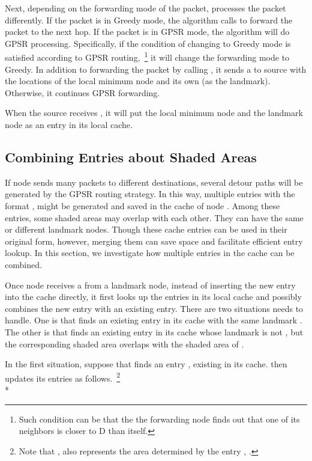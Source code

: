 \documentclass[3p,times]{elsarticle}
\begin{document}
Next, depending on the forwarding mode of the packet, 
processes the packet differently.
If the packet is in Greedy mode, the algorithm calls 
to forward the packet to the next hop.
If the packet is in GPSR mode, the algorithm will do GPSR processing.
Specifically, if the condition of changing to Greedy mode is satisfied according to
GPSR routing,~\footnote{Such condition can be that the the forwarding
node finds out that one of its neighbors is closer to D than itself.}
it will change the forwarding mode to Greedy.
In addition to forwarding the packet by calling , it sends a
 to source  with the locations of the local minimum
node  and its own (as the landmark).
Otherwise, it continues GPSR forwarding.





When the source receives
,
it will put the local minimum node  and the landmark node  as an entry in its local cache.



\subsection{Combining Entries about Shaded Areas}
\label{merge}


If node  sends many packets to different destinations, several detour paths will be generated by the GPSR routing strategy.
In this way, multiple entries with the format  ,   might be
generated and saved in the cache of node .
Among these entries, some shaded areas may overlap with each other. They
can have the same or different landmark nodes.
Though these cache entries can be used in their original form,
however, merging them can save space and facilitate efficient entry lookup.
In this section, we investigate how multiple entries in the cache can be combined.

Once node  receives a 
 from a landmark node, instead of inserting the new entry into the cache
directly, it first
looks up the entries in its local cache and possibly combines the new entry with an existing entry.
There are two situations  needs to handle. One is that  finds an existing entry in its cache with the same landmark .
The other is that
 finds an existing entry in its cache whose landmark is not ,
but the corresponding shaded area overlaps with the shaded area of .


In the first situation, suppose that  finds an entry  ,   existing in its cache.  then updates
its entries as follows.~\footnote{Note that  ,   also represents the area determined by
the entry  ,  .}\\*
\end{document}
